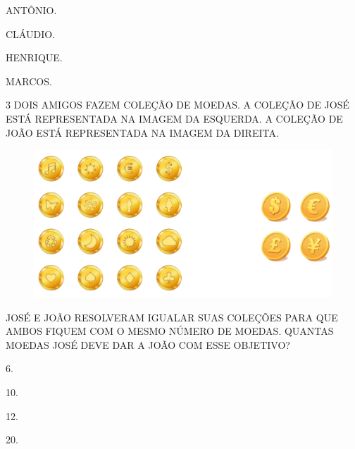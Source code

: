\begin{escolha}
\item ANTÔNIO.

\item CLÁUDIO.

\item HENRIQUE.

\item MARCOS.
\end{escolha}

\pagebreak
\num{3} DOIS AMIGOS FAZEM COLEÇÃO DE MOEDAS. A COLEÇÃO DE JOSÉ ESTÁ REPRESENTADA NA IMAGEM DA
ESQUERDA. A COLEÇÃO DE JOÃO ESTÁ REPRESENTADA NA IMAGEM DA DIREITA.


\begin{figure}[H]
\includegraphics[width=\textwidth]{./media/SAEB_1ANO_MAT_FIGURA121.png}
\end{figure}

JOSÉ E JOÃO RESOLVERAM IGUALAR SUAS COLEÇÕES PARA QUE AMBOS FIQUEM COM O MESMO NÚMERO DE MOEDAS. QUANTAS MOEDAS JOSÉ DEVE DAR A JOÃO COM ESSE OBJETIVO?

\begin{escolha}[itemsep=0pt]
\item 6.

\item 10.

\item 12.

\item 20.
\end{escolha}


